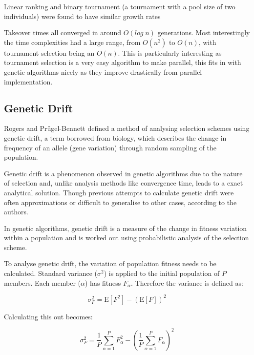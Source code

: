 \documentclass[10pt, a4paper]{article}
\begin{document}
Linear ranking and binary tournament (a tournament with a pool size of two
individuals) were found to have similar growth rates 


Takeover times all converged in around $O(log\;n)$ generations. Most 
interestingly the time complexities had a large range, from $O(n^2)$ to $O(n)$,
with tournament selection being an $O(n)$. This is particularly interesting as
tournament selection is a very easy algorithm to make parallel, this fits in
with genetic algorithms nicely as they improve drastically from parallel 
implementation.


\subsection{Genetic Drift}
Rogers and Pr\"{u}gel-Bennett\cite{Rogers1999Genetic} defined a method of 
analysing selection schemes using genetic drift, a term borrowed from biology,
which describes the change in frequency of an allele (gene variation) through
random sampling of the population.

Genetic drift is a phenomenon observed in genetic algorithms due to the nature
of selection and, unlike analysis methods like convergence time, leads to a
exact analytical solution. Though previous attempts to calculate genetic drift
were often approximations or difficult to generalise to other cases, according
to the authors.

In genetic algorithms, genetic drift is a measure of the change in fitness
variation within a population and is worked out using probabilistic analysis of
the selection scheme. 

To analyse genetic drift, the variation of population fitness needs to be
calculated. Standard variance ($\sigma^2$) is applied to the initial population
of $P$ members. Each member ($\alpha$) has fitness $F_\alpha$. Therefore the
variance is defined as:

\begin{equation}
\sigma_F^2 = \text{E}[F^2] - (\text{E}[F])^2
\end{equation}

Calculating this out becomes:

\begin{equation}
\sigma_F^2 = \frac{1}{P}\sum^{P}_{\alpha=1}{F^{2}_{\alpha}} - \left(
\frac{1}{P}\sum^{P}_{\alpha=1}{F_{\alpha}}\right)^2
\end{equation}
\end{document}
